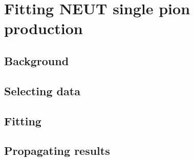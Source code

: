 \chapter{Fitting NEUT single pion production}
\label{chap:1pi_fits}

\section{Background}
\label{sec:1pi_fits:background}


\section{Selecting data}
\label{sec:1pi_fits:data}


\section{Fitting}
\label{sec:1pi_fits:fit}


\section{Propagating results}
\label{sec:1pi_fits:prop}

